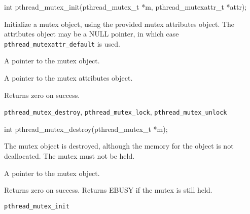 \begin{apisyn}

	\funcproto int pthread_mutex_init(pthread_mutex_t *m,
                                          pthread_mutexattr_t *attr);
\end{apisyn}
\begin{apidesc}
	Initialize a mutex object, using the provided mutex attributes
	object. The attributes object may be a NULL pointer, in which case
	{\tt pthread_mutexattr_default} is used.
\end{apidesc}
\begin{apiparm}
	\item[mutex]
		A pointer to the mutex object.
	\item[attr]
		A pointer to the mutex attributes object.
\end{apiparm}
\begin{apiret}
	Returns zero on success.
\end{apiret}
\begin{apirel}
	{\tt pthread_mutex_destroy}, {\tt pthread_mutex_lock},
	{\tt pthread_mutex_unlock}
\end{apirel}


\begin{apisyn}

	\funcproto int pthread_mutex_destroy(pthread_mutex_t *m);
\end{apisyn}
\begin{apidesc}
	The mutex object is destroyed, although the memory for the object
	is not deallocated. The mutex must not be held.
\end{apidesc}
\begin{apiparm}
	\item[mutex]
		A pointer to the mutex object.
\end{apiparm}
\begin{apiret}
	Returns zero on success. Returns EBUSY if the mutex is still held.
\end{apiret}
\begin{apirel}
	{\tt pthread_mutex_init}
\end{apirel}


